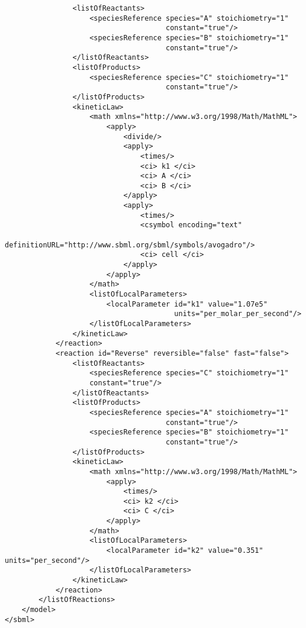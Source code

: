 {\begin{verbatim}
                <listOfReactants>
                    <speciesReference species="A" stoichiometry="1"
                                      constant="true"/>
                    <speciesReference species="B" stoichiometry="1"
                                      constant="true"/>
                </listOfReactants>
                <listOfProducts>
                    <speciesReference species="C" stoichiometry="1"
                                      constant="true"/>
                </listOfProducts>
                <kineticLaw>
                    <math xmlns="http://www.w3.org/1998/Math/MathML">
                        <apply>
                            <divide/>
                            <apply>
                                <times/>
                                <ci> k1 </ci>
                                <ci> A </ci>
                                <ci> B </ci>
                            </apply>
                            <apply>
                                <times/>
                                <csymbol encoding="text"
                      definitionURL="http://www.sbml.org/sbml/symbols/avogadro"/>
                                <ci> cell </ci>
                            </apply>
                        </apply>
                    </math>
                    <listOfLocalParameters>
                        <localParameter id="k1" value="1.07e5"
                                        units="per_molar_per_second"/>
                    </listOfLocalParameters>
                </kineticLaw>
            </reaction>
            <reaction id="Reverse" reversible="false" fast="false">
                <listOfReactants>
                    <speciesReference species="C" stoichiometry="1"
                    constant="true"/>
                </listOfReactants>
                <listOfProducts>
                    <speciesReference species="A" stoichiometry="1"
                                      constant="true"/>
                    <speciesReference species="B" stoichiometry="1"
                                      constant="true"/>
                </listOfProducts>
                <kineticLaw>
                    <math xmlns="http://www.w3.org/1998/Math/MathML">
                        <apply>
                            <times/>
                            <ci> k2 </ci>
                            <ci> C </ci>
                        </apply>
                    </math>
                    <listOfLocalParameters>
                        <localParameter id="k2" value="0.351" units="per_second"/>
                    </listOfLocalParameters>
                </kineticLaw>
            </reaction>
        </listOfReactions>
    </model>
</sbml>
\end{verbatim}}

